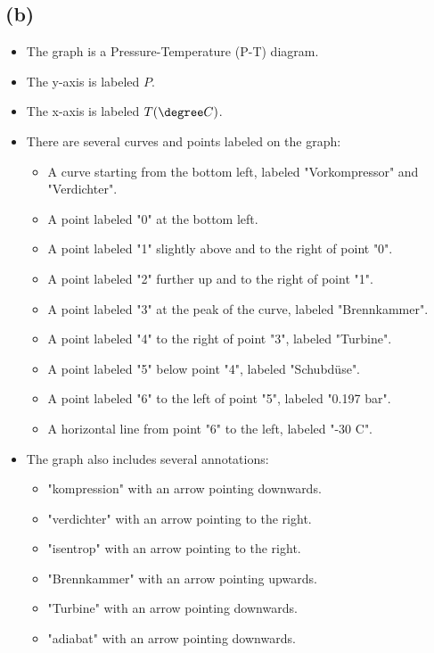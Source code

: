 \subsection*{(b)}

\begin{itemize}
    \item The graph is a Pressure-Temperature (P-T) diagram.
    \item The y-axis is labeled \( P \).
    \item The x-axis is labeled \( T (\degree C) \).
    \item There are several curves and points labeled on the graph:
        \begin{itemize}
            \item A curve starting from the bottom left, labeled "Vorkompressor" and "Verdichter".
            \item A point labeled "0" at the bottom left.
            \item A point labeled "1" slightly above and to the right of point "0".
            \item A point labeled "2" further up and to the right of point "1".
            \item A point labeled "3" at the peak of the curve, labeled "Brennkammer".
            \item A point labeled "4" to the right of point "3", labeled "Turbine".
            \item A point labeled "5" below point "4", labeled "Schubdüse".
            \item A point labeled "6" to the left of point "5", labeled "0.197 bar".
            \item A horizontal line from point "6" to the left, labeled "-30 \degree C".
        \end{itemize}
    \item The graph also includes several annotations:
        \begin{itemize}
            \item "kompression" with an arrow pointing downwards.
            \item "verdichter" with an arrow pointing to the right.
            \item "isentrop" with an arrow pointing to the right.
            \item "Brennkammer" with an arrow pointing upwards.
            \item "Turbine" with an arrow pointing downwards.
            \item "adiabat" with an arrow pointing downwards.
        \end{itemize}
\end{itemize}

